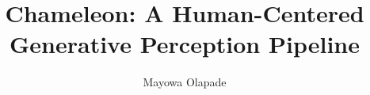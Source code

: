 \documentclass[conference]{IEEEtran}
\begin{document}
\title{Chameleon: A Human-Centered Generative Perception Pipeline}
\author{Mayowa Olapade}
\maketitle








\end{document}
